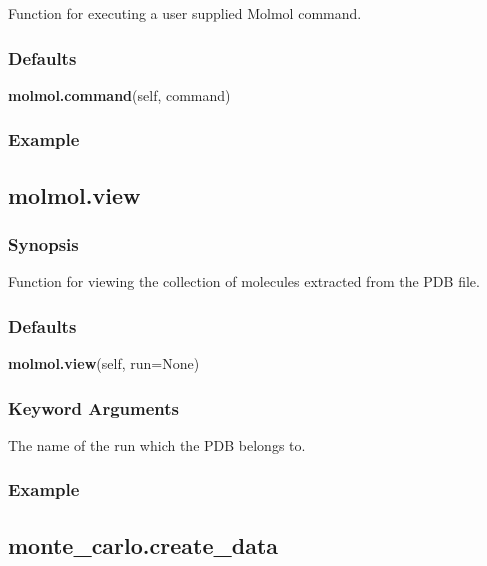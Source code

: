 Function for executing a user supplied Molmol command.

\subsubsection{Defaults}

\textsf{\textbf{molmol.command}(self, command)}


\subsubsection{Example}




\newpage

\subsection{molmol.view}


\subsubsection{Synopsis}

Function for viewing the collection of molecules extracted from the PDB file.

\subsubsection{Defaults}

\textsf{\textbf{molmol.view}(self, run=None)}


\subsubsection{Keyword Arguments}


  The name of the run which the PDB belongs to.

\subsubsection{Example}





\newpage

\subsection{monte\_carlo.create\_data}


